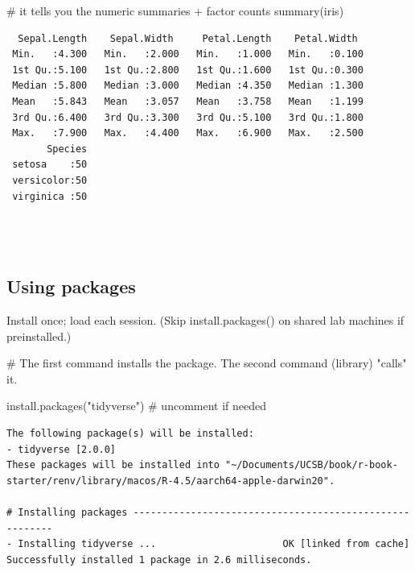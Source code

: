 \documentclass[
  letterpaper,
  DIV=11,
  numbers=noendperiod]{scrreprt}
\newenvironment{Shaded}{\begin{snugshade}}{\end{snugshade}}
\newcommand{\CommentTok}[1]{\textcolor[rgb]{0.37,0.37,0.37}{#1}}
\newcommand{\FunctionTok}[1]{\textcolor[rgb]{0.28,0.35,0.67}{#1}}
\newcommand{\NormalTok}[1]{\textcolor[rgb]{0.00,0.23,0.31}{#1}}
\newcommand{\StringTok}[1]{\textcolor[rgb]{0.13,0.47,0.30}{#1}}
\begin{document}
\begin{Shaded}
\begin{Highlighting}[]
\CommentTok{\# it tells you the numeric summaries + factor counts}
\FunctionTok{summary}\NormalTok{(iris)          }
\end{Highlighting}
\end{Shaded}

\begin{verbatim}
  Sepal.Length    Sepal.Width     Petal.Length    Petal.Width   
 Min.   :4.300   Min.   :2.000   Min.   :1.000   Min.   :0.100  
 1st Qu.:5.100   1st Qu.:2.800   1st Qu.:1.600   1st Qu.:0.300  
 Median :5.800   Median :3.000   Median :4.350   Median :1.300  
 Mean   :5.843   Mean   :3.057   Mean   :3.758   Mean   :1.199  
 3rd Qu.:6.400   3rd Qu.:3.300   3rd Qu.:5.100   3rd Qu.:1.800  
 Max.   :7.900   Max.   :4.400   Max.   :6.900   Max.   :2.500  
       Species  
 setosa    :50  
 versicolor:50  
 virginica :50  
                
                
                
\end{verbatim}

\subsection{Using packages}\label{using-packages}

Install once; load each session. (Skip install.packages() on shared lab
machines if preinstalled.)

\begin{Shaded}
\begin{Highlighting}[]
\CommentTok{\# The first command installs the package. The second command (library) "calls" it. }

\FunctionTok{install.packages}\NormalTok{(}\StringTok{"tidyverse"}\NormalTok{)   }\CommentTok{\# uncomment if needed}
\end{Highlighting}
\end{Shaded}

\begin{verbatim}
The following package(s) will be installed:
- tidyverse [2.0.0]
These packages will be installed into "~/Documents/UCSB/book/r-book-starter/renv/library/macos/R-4.5/aarch64-apple-darwin20".

# Installing packages --------------------------------------------------------
- Installing tidyverse ...                      OK [linked from cache]
Successfully installed 1 package in 2.6 milliseconds.
\end{verbatim}
\end{document}
